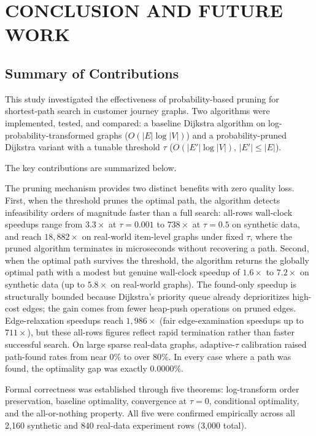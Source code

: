 \chapter{CONCLUSION AND FUTURE WORK}\label{chap:conclusion}

\section{Summary of Contributions}

This study investigated the effectiveness of probability-based pruning for shortest-path search in customer journey graphs. Two algorithms were implemented, tested, and compared: a baseline Dijkstra algorithm on log-probability-transformed graphs ($O(|E|\log|V|)$) and a probability-pruned Dijkstra variant with a tunable threshold $\tau$ ($O(|E'|\log|V|)$, $|E'|\leq|E|$).

The key contributions are summarized below.

The pruning mechanism provides two distinct benefits with zero quality loss. First, when the threshold prunes the optimal path, the algorithm detects infeasibility orders of magnitude faster than a full search: all-rows wall-clock speedups range from $3.3\times$ at $\tau=0.001$ to $738\times$ at $\tau=0.5$ on synthetic data, and reach $18{,}882\times$ on real-world item-level graphs under fixed $\tau$, where the pruned algorithm terminates in microseconds without recovering a path. Second, when the optimal path survives the threshold, the algorithm returns the globally optimal path with a modest but genuine wall-clock speedup of $1.6\times$ to $7.2\times$ on synthetic data (up to $5.8\times$ on real-world graphs). The found-only speedup is structurally bounded because Dijkstra's priority queue already deprioritizes high-cost edges; the gain comes from fewer heap-push operations on pruned edges. Edge-relaxation speedups reach $1{,}986\times$ (fair edge-examination speedups up to $711\times$), but these all-rows figures reflect rapid termination rather than faster successful search. On large sparse real-data graphs, adaptive-$\tau$ calibration raised path-found rates from near 0\% to over 80\%. In every case where a path was found, the optimality gap was exactly $0.0000\%$.

Formal correctness was established through five theorems: log-transform order preservation, baseline optimality, convergence at $\tau=0$, conditional optimality, and the all-or-nothing property. All five were confirmed empirically across all 2,160 synthetic and 840 real-data experiment rows (3,000 total).

